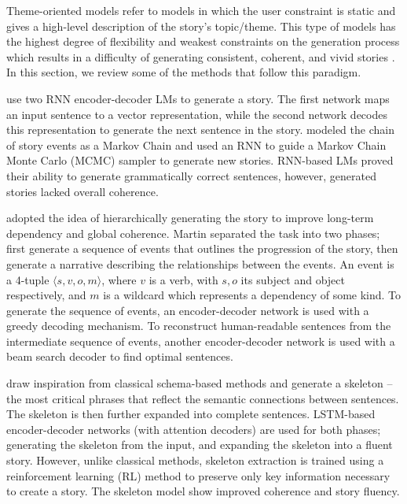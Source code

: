 Theme-oriented models refer to models in which the user constraint is static and gives a high-level description of the story's topic/theme. This type of models has the highest degree of flexibility and weakest constraints on the generation process which results in a difficulty of generating consistent, coherent, and vivid stories \citep{hou2019survey}. In this section, we review some of the methods that follow this paradigm.

\citep{choi2016recurrent} use two RNN encoder-decoder LMs to generate a story. The first network maps an input sentence to a vector representation, while the second network decodes this representation to generate the next sentence in the story. \citep{harrison2017toward} modeled the chain of story events as a Markov Chain and used an RNN to guide a Markov Chain Monte Carlo (MCMC) sampler to generate new stories. RNN-based LMs proved their ability to generate grammatically correct sentences, however, generated stories lacked overall coherence.

\citep{martin2018event} adopted the idea of hierarchically generating the story to improve long-term dependency and global coherence. Martin separated the task into two phases; first generate a sequence of events that outlines the progression of the story, then generate a narrative describing the relationships between the events. An event is a 4-tuple $\langle s, v, o, m \rangle$, where $v$ is a verb, with $s, o$ its subject and object respectively, and $m$ is a wildcard which represents a dependency of some kind. To generate the sequence of events, an encoder-decoder network is used with a greedy decoding mechanism. To reconstruct human-readable sentences from the intermediate sequence of events, another encoder-decoder network is used with a beam search decoder to find optimal sentences. 

\citep{xu2018skeleton} draw inspiration from classical schema-based methods and generate a skeleton -- the most critical phrases that reflect the semantic connections between sentences. The skeleton is then further expanded into complete sentences. LSTM-based encoder-decoder networks (with attention decoders) are used for both phases; generating the skeleton from the input, and expanding the skeleton into a fluent story. However, unlike classical methods, skeleton extraction is trained using a reinforcement learning (RL) method to preserve only key information necessary to create a story. The skeleton model show improved coherence and story fluency.

